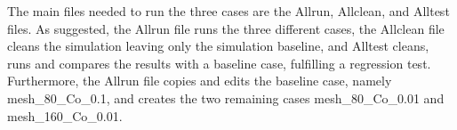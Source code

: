 \documentclass[a4paper,12pt]{article}
\begin{document}
The main files needed to run the three cases are the Allrun, Allclean, and Alltest files. As suggested, the Allrun file runs the three different cases, the Allclean file cleans the simulation leaving only the simulation baseline, and Alltest cleans, runs and compares the results with a baseline case, fulfilling a regression test. Furthermore, the Allrun file copies and edits the baseline case, namely mesh\_80\_Co\_0.1, and creates the two remaining cases mesh\_80\_Co\_0.01 and mesh\_160\_Co\_0.01. 
\end{document}
